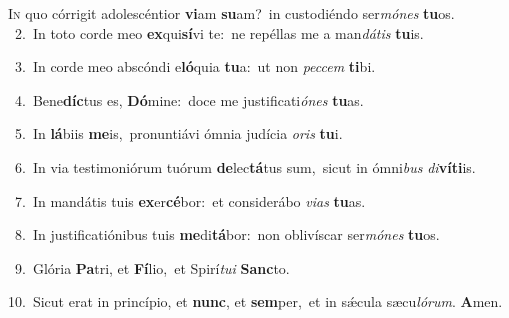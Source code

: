 \lettrine{\initial\textcolor{\initialcolor}{I}}{n} quo córrigit adolescéntior \textbf{vi}\-am \textbf{su}\-am?~\star in custodiéndo ser\-\textit{mó}\-\textit{nes} \textbf{tu}\-os.\\
{\numbfont\textcolor{\numbcolor}{~2.}}~In toto corde meo \textbf{ex}\-qui\-\textbf{sí}\-vi te:~\star ne repéllas me a man\-\textit{dá}\-\textit{tis} \textbf{tu}\-is.\par
{\numbfont\textcolor{\numbcolor}{~3.}}~In corde meo abscóndi e\-\textbf{ló}\-quia \textbf{tu}\-a:~\star ut non \textit{pec}\-\textit{cem} \textbf{ti}\-bi.\par
{\numbfont\textcolor{\numbcolor}{~4.}}~Bene\-\textbf{díc}\-tus es, \textbf{Dó}\-mine:~\star doce me justificati\-\textit{ó}\-\textit{nes} \textbf{tu}\-as.\par
{\numbfont\textcolor{\numbcolor}{~5.}}~In \textbf{lá}\-biis \textbf{me}\-is,~\star pronuntiávi ómnia judícia \textit{o}\-\textit{ris} \textbf{tu}\-i.\par
{\numbfont\textcolor{\numbcolor}{~6.}}~In via testimoniórum tuórum \textbf{de}\-lec\-\textbf{tá}\-tus sum,~\star sicut in ómni\textit{bus} \textit{di}\-\textbf{ví}\textbf{ti}is.\par
{\numbfont\textcolor{\numbcolor}{~7.}}~In mandátis tuis \textbf{ex}\-er\-\textbf{cé}\-bor:~\star et considerábo \textit{vi}\-\textit{as} \textbf{tu}\-as.\par
{\numbfont\textcolor{\numbcolor}{~8.}}~In justificatiónibus tuis \textbf{me}\-di\-\textbf{tá}\-bor:~\star non oblivíscar ser\-\textit{mó}\-\textit{nes} \textbf{tu}\-os.\par
{\numbfont\textcolor{\numbcolor}{~9.}}~Glória \textbf{Pa}\-tri, et \textbf{Fí}\-lio,~\star et Spirí\-\textit{tu}\-\textit{i} \textbf{Sanc}\-to.\par
{\numbfont\textcolor{\numbcolor}{10.}}~Sicut erat in princípio, et \textbf{nunc}\-, et \textbf{sem}\-per,~\star et in sǽcula sæcu\-\textit{ló}\-\textit{rum}. \textbf{A}\-men.\par
